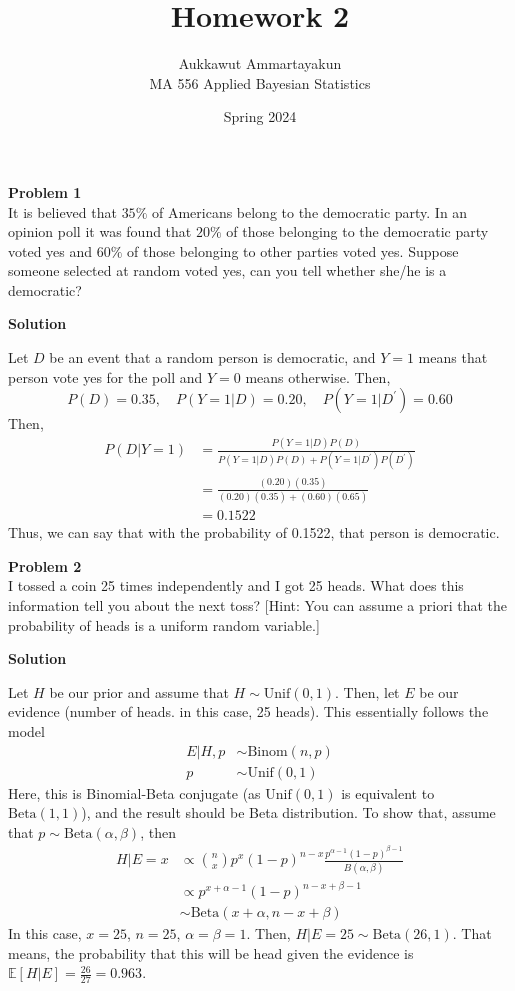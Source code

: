 \documentclass{article}
\title{Homework 2}
\author{Aukkawut Ammartayakun\\MA 556 Applied Bayesian Statistics}
\date{Spring 2024}
\begin{document}
\maketitle
\noindent
\Large{\textbf{Problem 1}}\normalsize
\\


It is believed that $35\%$ of Americans belong to the democratic party. In an opinion poll it was found that $20\%$ of those belonging to the democratic party voted yes and $60\%$ of those belonging to other parties voted yes. Suppose someone selected at random voted yes, can you tell whether she/he is a democratic?

\vspace{\baselineskip}
\noindent
\textbf{Solution}

Let $D$ be an event that a random person is democratic, and $Y = 1$ means that person vote yes for the poll and $Y = 0$ means otherwise. Then,
\[P(D) = 0.35, \quad P(Y = 1|D) = 0.20, \quad P(Y = 1|D^{'}) = 0.60 \]
Then,
\begin{align*}
    P(D|Y=1) &= \frac{P(Y=1|D)P(D)}{P(Y=1|D)P(D) + P(Y=1|D^{'}) P(D^{'})}\\
    &= \frac{(0.20)(0.35)}{(0.20)(0.35) + (0.60)(0.65)}\\
    &= 0.1522
\end{align*}
Thus, we can say that with the probability of 0.1522, that person is democratic.
\vspace{\baselineskip}

\noindent
\Large{\textbf{Problem 2}}\normalsize
\\


I tossed a coin 25 times independently and I got 25 heads. What does this
information tell you about the next toss?  [Hint: You can assume a priori that the probability of heads is a uniform random variable.]


\vspace{\baselineskip}
\noindent
\textbf{Solution}

Let $H$ be our prior and assume that $H\sim \text{Unif}(0,1)$. Then, let $E$ be our evidence (number of heads. in this case, 25 heads). This essentially follows the model
\begin{align*}
    E|H,p &\sim \text{Binom}(n,p)\\
    p &\sim \text{Unif}(0,1)
\end{align*}
Here, this is Binomial-Beta conjugate (as $\text{Unif}(0,1)$ is equivalent to $\text{Beta}(1,1)$), and the result should be Beta distribution. To show that, assume that $p\sim \text{Beta}(\alpha,\beta)$, then
\begin{align*}
    H|E = x &\propto {n\choose x} p^{x}(1-p)^{n-x} \frac{p^{\alpha-1}(1-p)^{\beta - 1}}{B(\alpha,\beta)}\\
    &\propto p^{x+\alpha -1} (1-p)^{n-x+\beta - 1}\\
    &\sim \text{Beta}(x+\alpha, n-x+\beta)
\end{align*}
In this case, $x = 25$, $n = 25$, $\alpha = \beta = 1$. Then, $H|E = 25 \sim \text{Beta}(26,1)$. That means, the probability that this will be head given the evidence is $\mathbb{E}[H|E] = \frac{26}{27} = 0.963$.
\end{document}
